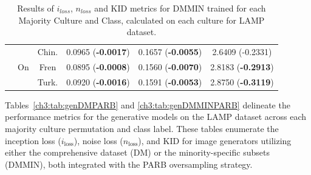 \begin{table}[]
\begin{tabular}{c|c|c|c|c|c}
\hhline{~-----}
 & \multirow{3}{*}{On} & Chin. & 0.0965 (\textbf{-0.0017})       & 0.1657 (\textbf{-0.0055})       & 2.6409 (-0.2331)  \\
 &  & Fren & 0.0895 (\textbf{-0.0008})       & 0.1560 (\textbf{-0.0070})       & 2.8183 (\textbf{-0.2913}) \\
 &  & Turk. & 0.0920 (\textbf{-0.0016})       & 0.1591 (\textbf{-0.0053})       & 2.8750 (\textbf{-0.3119}) \\
\bottomrule
    \end{tabular}
    \caption{Results of $i_{loss}$, $n_{loss}$ and KID metrics for DMMIN trained for each Majority Culture and Class, calculated on each culture for LAMP dataset.}
    \label{ch3:tab:genDMMIN}
\end{table}
%
Tables~\ref{ch3:tab:genDMPARB} and \ref{ch3:tab:genDMMINPARB} delineate the performance metrics for the generative models on the LAMP dataset across each majority culture permutation and class label. These tables enumerate the inception loss ($i_{\text{loss}}$), noise loss ($n_{\text{loss}}$), and KID for image generators utilizing either the comprehensive dataset (DM) or the minority-specific subsets (DMMIN), both integrated with the PARB oversampling strategy.

